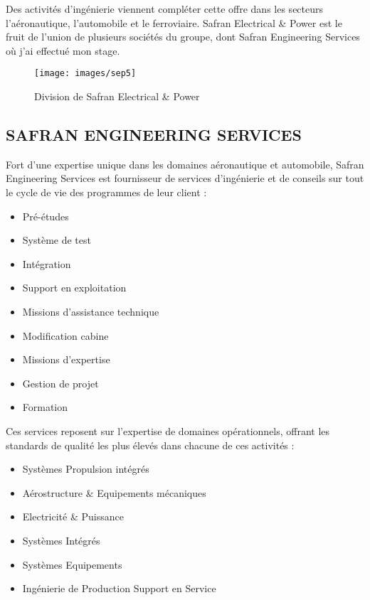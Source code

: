 Des activités d’ingénierie viennent compléter cette offre dans les secteurs l’aéronautique, l’automobile et le ferroviaire. Safran Electrical \& Power est le fruit de l’union de plusieurs sociétés du groupe, dont Safran Engineering Services où j’ai effectué mon stage.\\

\begin{figure}
\begin{center}
\texttt{[image: images/sep5]}
\end{center}
\caption{Division de Safran Electrical \& Power }
\end{figure}



\subsection  {SAFRAN ENGINEERING SERVICES}

Fort d’une expertise unique dans les domaines aéronautique et automobile, Safran Engineering Services est fournisseur de services d’ingénierie et de conseils sur tout le cycle de vie des programmes de leur client :\\ 

\begin{itemize}
\item Pré-études
\item Système de test
\item Intégration
\item Support en exploitation
\item Missions d'assistance technique
\item Modification cabine
\item Missions d'expertise
\item Gestion de projet
\item Formation\\
\end{itemize}

Ces services reposent sur l'expertise de domaines opérationnels, offrant les standards de qualité les plus élevés dans chacune de ces activités :

\begin{itemize}
\item Systèmes Propulsion intégrés
\item Aérostructure \& Equipements mécaniques
\item Electricité \& Puissance
\item Systèmes Intégrés
\item Systèmes Equipements
\item Ingénierie de Production Support en Service\\
\end{itemize}



